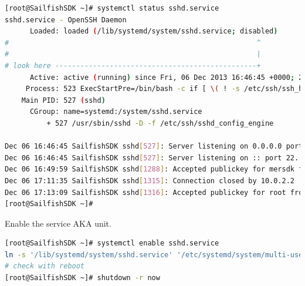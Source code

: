 \begin{lstlisting}[language=bash]
[root@SailfishSDK ~]# systemctl status sshd.service
sshd.service - OpenSSH Daemon
	  Loaded: loaded (/lib/systemd/system/sshd.service; disabled)
#                                                           ^
#                                                           |
# look here ------------------------------------------------+
	  Active: active (running) since Fri, 06 Dec 2013 16:46:45 +0000; 28min ago
	 Process: 523 ExecStartPre=/bin/bash -c if [ \( ! -s /etc/ssh/ssh_host_dsa_key \) -a \( ! -s /etc/ssh/ssh_host_dsa_key.pub \) -a \( ! -s /etc/ssh/ssh_host_rsa_key \) -a \( ! -s /etc/ssh/ssh_host_rsa_key.pub \) ]; then /usr/sbin/sshd-hostkeys; fi (code=exited, status=0/SUCCESS)
	Main PID: 527 (sshd)
	  CGroup: name=systemd:/system/sshd.service
		  + 527 /usr/sbin/sshd -D -f /etc/ssh/sshd_config_engine

Dec 06 16:46:45 SailfishSDK sshd[527]: Server listening on 0.0.0.0 port 22.
Dec 06 16:46:45 SailfishSDK sshd[527]: Server listening on :: port 22.
Dec 06 16:49:59 SailfishSDK sshd[1288]: Accepted publickey for mersdk from 10.0.2.2 port 49275 ssh2
Dec 06 17:11:35 SailfishSDK sshd[1315]: Connection closed by 10.0.2.2
Dec 06 17:13:09 SailfishSDK sshd[1316]: Accepted publickey for root from 10.0.2.2 port 49300 ssh2
[root@SailfishSDK ~]#
\end{lstlisting}
%
Enable the service AKA unit.
\begin{lstlisting}[language=bash]
[root@SailfishSDK ~]# systemctl enable sshd.service
ln -s '/lib/systemd/system/sshd.service' '/etc/systemd/system/multi-user.target.wants/sshd.service'
# check with reboot
[root@SailfishSDK ~]# shutdown -r now
\end{lstlisting}
%
%
